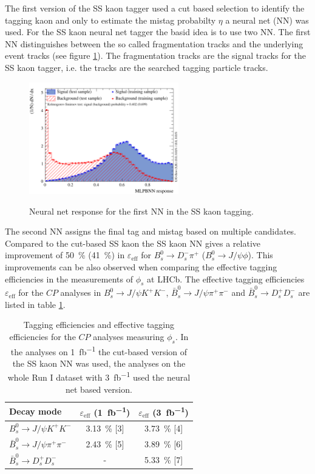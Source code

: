 \documentclass{PoS}
\begin{document}
The first version of the SS kaon tagger used a cut based selection to identify the tagging kaon and only to estimate the mistag probabilty $\eta$ a neural net (NN) was used. For the SS kaon neural net tagger the basid idea is to use two NN. The first NN distinguishes between the so called fragmentation tracks and the underlying event tracks (see figure \ref{fig:nnet}). The fragmentation tracks are the signal tracks for the SS kaon tagger, i.e. the tracks are the searched tagging particle tracks. 
\begin{figure}[htbp]
	\begin{center}
		\includegraphics[width=0.58\textwidth, angle=0]{figs/sskaonNnetfirstNN3.pdf}
		\small{\caption{Neural net response for the first NN in the SS kaon tagging.}}
		\label{fig:nnet}
	\end{center}
\end{figure}
The second NN assigns the final tag and mistag based on multiple candidates.\\ 
Compared to the cut-based SS kaon the SS kaon NN gives a relative improvement of \SI{50}{\%} (\SI{41}{\%}) in $\varepsilon_\text{eff}$ for $B_s^0\to D_s^-\pi^+$ ($B_s^0\to J\!/\!\psi\phi$). This improvements can be also observed when comparing the effective tagging efficiencies in the measurements of $\phi_s$ at LHCb. The effective tagging efficiencies $\varepsilon_\text{eff}$ for the $C\!P$ analyses in \mbox{$B_s^0\to J\!/\!\psi K^+K^-$}, $\bar{B}_s^0\to J\!/\!\psi \pi^+\pi^-$ and $\bar{B}_s^0\to D_s^+D_s^-$ are listed in table \ref{tab:phis}.
\begin{table}[htbp]
  \centering
  \begin{tabular}{lcc}
  \toprule
Decay mode & $\varepsilon_\text{eff}$ (\SI{1}{fb^{-1}}) & $\varepsilon_\text{eff}$ (\SI{3}{fb^{-1}}) \\
  \midrule
  $B_s^0\to J\!/\!\psi K^+K^-$ & \SI{3.13}{\%} [3] & \SI{3.73}{\%} [4] \\ 
  $\bar{B}_s^0\to J\!/\!\psi \pi^+\pi^-$ & \SI{2.43}{\%} [5] & \SI{3.89}{\%} [6] \\
  $\bar{B}_s^0\to D_s^+D_s^-$ & - & \SI{5.33}{\%} [7] \\
  \bottomrule
  \end{tabular}
 \small{ \caption{Tagging efficiencies and effective tagging efficiencies for the $C\!P$ analyses measuring $\phi_s$. In the analyses on \SI{1}{fb^{-1}} the cut-based version of the SS kaon NN was used, the analyses on the whole Run I dataset with \SI{3}{fb^{-1}} used the neural net based version. }}
  \label{tab:phis}
\end{table} 
\end{document}
